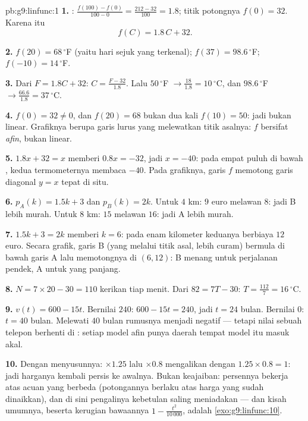 \begin{solution}{pb:g9:linfunc:1}
\textbf{1.} : $\frac{f(100) - f(0)}{100 - 0} =
\frac{212 - 32}{100} = 1.8$; titik potongnya $f(0) = 32$. Karena itu
\[
f(C) = 1.8\,C + 32 .
\]

\textbf{2.} $f(20) = 68\,^\circ$F (yaitu hari sejuk yang terkenal);
$f(37) = 98.6\,^\circ$F; $f(-10) = 14\,^\circ$F.

\textbf{3.} Dari $F = 1.8C + 32$:
$C = \frac{F - 32}{1.8}$. Lalu $50\,^\circ$F
$\to \frac{18}{1.8} = 10\,^\circ$C, dan $98.6\,^\circ$F
$\to \frac{66.6}{1.8} = 37\,^\circ$C.

\textbf{4.} $f(0) = 32 \neq 0$, dan $f(20) = 68$ bukan dua kali
$f(10) = 50$: jadi bukan linear. Grafiknya berupa garis lurus yang
melewatkan titik asalnya: $f$ bersifat \emph{afin}, bukan linear.

\textbf{5.} $1.8x + 32 = x$ memberi $0.8x = -32$, jadi $x = -40$:
pada empat puluh di bawah , kedua termometernya membaca $-40$. Pada
grafiknya, garis $f$ memotong garis diagonal $y = x$ tepat di situ.

\textbf{6.} $p_A(k) = 1.5k + 3$ dan $p_B(k) = 2k$. Untuk $4$ km:
$9$ euro melawan $8$: jadi B lebih murah. Untuk $8$ km: $15$ melawan
$16$: jadi A lebih murah.

\textbf{7.} $1.5k + 3 = 2k$ memberi $k = 6$: pada enam kilometer
keduanya berbiaya $12$ euro. Secara grafik, garis B (yang melalui
titik asal, lebih curam) bermula di bawah garis A lalu memotongnya di
$(6, 12)$: B menang untuk perjalanan pendek, A untuk yang panjang.

\textbf{8.} $N = 7 \times 20 - 30 = 110$ kerikan tiap menit. Dari
$82 = 7T - 30$: $T = \frac{112}{7} = 16\,^\circ$C.

\textbf{9.} $v(t) = 600 - 15t$. Bernilai $240$:
$600 - 15t = 240$, jadi $t = 24$ bulan. Bernilai $0$: $t = 40$ bulan.
Melewati $40$ bulan rumusnya menjadi negatif --- tetapi nilai sebuah
telepon berhenti di : setiap model afin punya daerah tempat model
itu masuk akal.

\textbf{10.} Dengan menyusunnya: $\times 1.25$ lalu $\times 0.8$
mengalikan dengan $1.25 \times 0.8 = 1$: jadi harganya kembali persis
ke awalnya. Bukan keajaiban: persennya bekerja atas acuan yang
berbeda (potongannya berlaku atas harga yang sudah dinaikkan), dan di
sini pengalinya kebetulan saling meniadakan --- dan kisah umumnya,
beserta
kerugian bawaannya $1 - \frac{t^2}{10\,000}$, adalah
\cref{exo:g9:linfunc:10}.


\end{solution}
